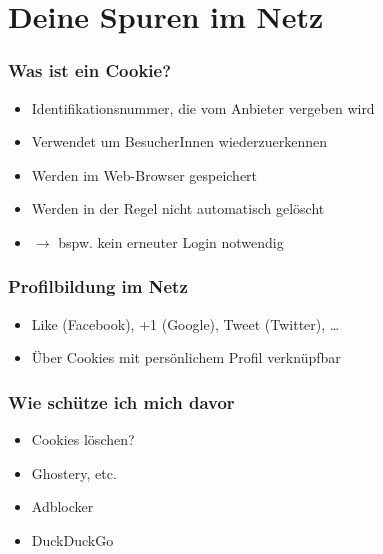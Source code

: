 \section{Deine Spuren im Netz}

\begin{frame}
\frametitle{Was ist ein Cookie?}

\begin{itemize}
  \item Identifikationsnummer, die vom Anbieter vergeben wird
  \item Verwendet um BesucherInnen wiederzuerkennen
  \item Werden im Web-Browser gespeichert
  \item Werden in der Regel nicht automatisch gelöscht
  \item $\rightarrow$ bspw. kein erneuter Login notwendig
\end{itemize}

\end{frame}

\begin{frame}
\frametitle{Profilbildung im Netz}

\begin{itemize}
  \item Like (Facebook), +1 (Google), Tweet (Twitter), \dots
  \item Über Cookies mit persönlichem Profil verknüpfbar
\end{itemize}

\end{frame}

\begin{frame}
  \frametitle{Wie schütze ich mich davor}
  \begin{itemize}
    \item Cookies löschen?
    \item Ghostery, etc.
    \item Adblocker
    \item DuckDuckGo
  \end{itemize}
\end{frame}



